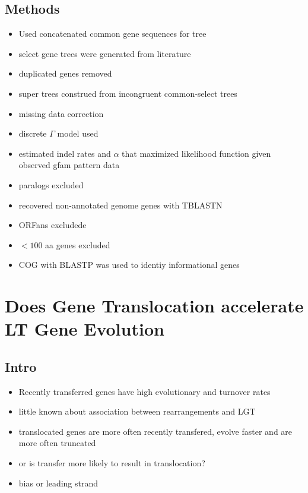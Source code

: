 \documentclass[10pt,letter]{article}
\begin{document}
\subsection*{Methods}
\begin{itemize}
    \item Used concatenated common gene sequences for tree
    \item select gene trees were generated from literature
    \item duplicated genes removed
    \item super trees construed from incongruent common-select trees
    \item missing data correction
    \item discrete $\Gamma$ model used
    \item estimated indel rates and $\alpha$ that maximized likelihood function given observed gfam pattern data
    \item paralogs excluded
    \item recovered non-annotated genome genes with TBLASTN
    \item ORFans excludede
    \item $< 100$ aa genes excluded
    \item COG with BLASTP was used to identiy informational genes
\end{itemize}
\section*{Does Gene Translocation accelerate LT Gene Evolution\cite{trans}}
\subsection*{Intro}
\begin{itemize}
    \item Recently transferred genes have high evolutionary and turnover rates
    \item little known about association between rearrangements and LGT
    \item translocated genes are more often recently transfered, evolve faster and are more often truncated
    \item or is transfer more likely to result in translocation?
    \item bias or leading strand
\end{itemize}
\end{document}
